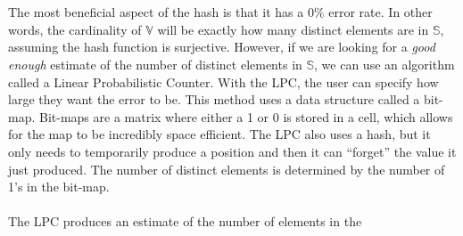 \documentclass{article}
\begin{document}
\\\\
\indent The most beneficial aspect of the hash is that it has a 0\% error rate. In other words, the cardinality of $\mathbb{V}$ will be exactly how many distinct elements are in $\mathbb{S}$, assuming the hash function is surjective. However, if we are looking for a \textit{good enough} estimate of the number of distinct elements in $\mathbb{S}$, we can use an algorithm called a Linear Probabilistic Counter. With the LPC, the user can specify how large they want the error to be. This method uses a data structure called a bit-map. Bit-maps are a matrix where either a 1 or 0 is stored in a cell, which allows for the map to be incredibly space efficient. The LPC also uses a hash, but it only needs to temporarily produce a position and then it can ``forget'' the value it just produced. The number of distinct elements is determined by the number of 1's in the bit-map.
\\\\
\indent The LPC produces an estimate of the number of elements in the 
\end{document}
